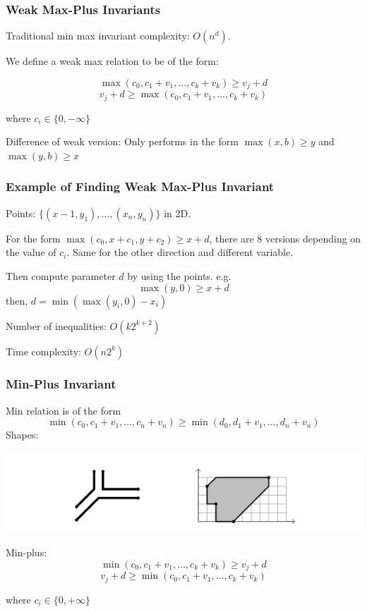\documentclass[11pt]{beamer}
\begin{document}
\begin{frame}\frametitle{Weak Max-Plus Invariants}
Traditional min max invariant complexity: $O(n^d)$.

We define a weak max relation to be of the form: 

\[\max(c_0, c_1 + v_1, \ldots, c_k + v_k) \ge v_j + d\]
\[v_j + d \ge \max(c_0,c_1 + v_1, \ldots, c_k + v_k)\]

where $c_i \in \{0, -\infty\}$

Difference of weak version: 
Only  performs in the form $\max(x, b) \ge y$ and $\max(y, b)\ge x$
\end{frame}

\begin{frame}\frametitle{Example of Finding Weak Max-Plus Invariant}
Points: $\{(x-1, y_1), \ldots, (x_n, y_n)\}$ in 2D. 

For the form $\max(c_0, x + c_1, y + c_2) \ge x + d$, there are 8 versions depending on the value of $c_i$. Same for the other direction and different variable. 

Then compute parameter $d$ by using the points. e.g.
\[\max(y,0)\ge x + d\]
then, $d = \min(\max(y_i, 0) - x_i)$

Number of inequalities: $O(k2^{k+2})$

Time complexity: $O(n2^k)$




\end{frame}

\begin{frame}\frametitle{Min-Plus Invariant}
Min relation is of the form
\[\min(c_0, c_1 + v_1, \ldots, c_n + v_n) \ge \min(d_0, d_1 + v_1, \ldots, d_n + v_n)\]
Shapes:
\begin{center}
\includegraphics[scale=0.4]{5.png}

\end{center}
Min-plus:
\[\min(c_0, c_1 + v_1, \ldots, c_k + v_k) \ge v_j + d\]
\[v_j + d \ge \min(c_0,c_1 + v_1, \ldots, c_k + v_k)\]

where $c_i \in \{0, +\infty\}$

\end{frame}
\end{document}
